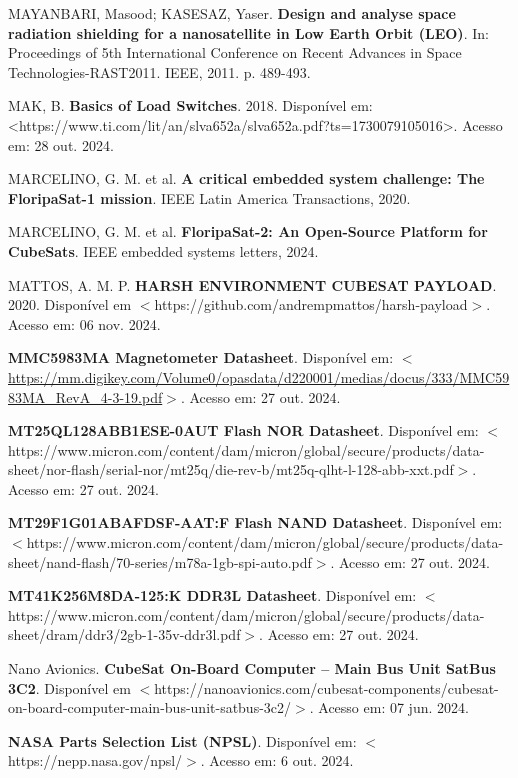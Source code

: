 \begin{flushleft}
\begin{thebibliography}{00}
 MAYANBARI, Masood; KASESAZ, Yaser. \textbf{Design and analyse space radiation shielding for a nanosatellite in Low Earth Orbit (LEO)}. In: Proceedings of 5th International Conference on Recent Advances in Space Technologies-RAST2011. IEEE, 2011. p. 489-493.

 MAK, B. \textbf{Basics of Load Switches}. 2018. Disponível em: <https://www.ti.com/lit/an/slva652a/slva652a.pdf?ts=1730079105016>. Acesso em: 28 out. 2024.

 MARCELINO, G. M. et al. \textbf{A critical embedded system challenge: The FloripaSat-1 mission}. IEEE Latin America Transactions, 2020.

 MARCELINO, G. M. et al. \textbf{FloripaSat-2: An Open-Source Platform for CubeSats}. IEEE embedded systems letters, 2024.

 MATTOS, A. M. P. \textbf{HARSH ENVIRONMENT CUBESAT PAYLOAD}. 2020. Disponível em $<$https://github.com/andrempmattos/harsh-payload$>$. Acesso em: 06 nov. 2024.

 \textbf{MMC5983MA Magnetometer Datasheet}. Disponível em: $<$\url{https://mm.digikey.com/Volume0/opasdata/d220001/medias/docus/333/MMC5983MA\_RevA\_4-3-19.pdf}$>$. Acesso em: 27 out. 2024. 

 \textbf{MT25QL128ABB1ESE-0AUT Flash NOR Datasheet}. Disponível em: $<$https://www.micron.com/content/dam/micron/global/secure/products/data-sheet/nor-flash/serial-nor/mt25q/die-rev-b/mt25q-qlht-l-128-abb-xxt.pdf$>$. Acesso em: 27 out. 2024. 

 \textbf{MT29F1G01ABAFDSF-AAT:F Flash NAND Datasheet}. Disponível em: $<$https://www.micron.com/content/dam/micron/global/secure/products/data-sheet/nand-flash/70-series/m78a-1gb-spi-auto.pdf$>$. Acesso em: 27 out. 2024. 

 \textbf{MT41K256M8DA-125:K DDR3L Datasheet}. Disponível em: $<$https://www.micron.com/content/dam/micron/global/secure/products/data-sheet/dram/ddr3/2gb-1-35v-ddr3l.pdf$>$. Acesso em: 27 out. 2024. 

 Nano Avionics. \textbf{CubeSat On-Board Computer – Main Bus Unit SatBus 3C2}. Disponível em $<$https://nanoavionics.com/cubesat-components/cubesat-on-board-computer-main-bus-unit-satbus-3c2/$>$. Acesso em: 07 jun. 2024.

 \textbf{NASA Parts Selection List (NPSL)}. Disponível em: $<$https://nepp.nasa.gov/npsl/$>$. Acesso em: 6 out. 2024.


\end{thebibliography}
\end{flushleft}
